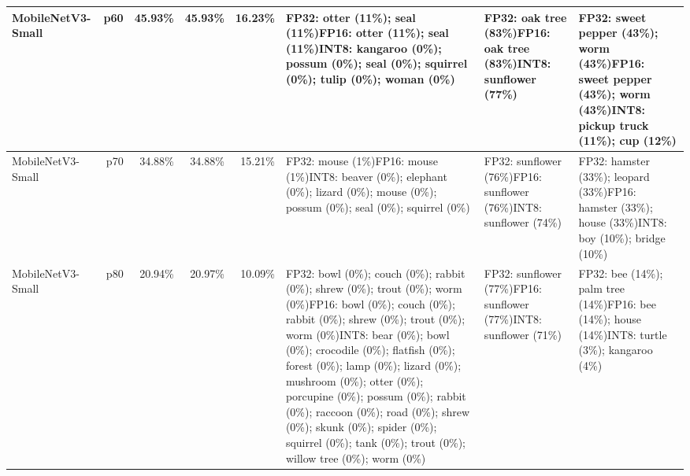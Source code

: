 \begin{longtable}{p{2.8cm} r r r r p{5.0cm} p{4.2cm} p{4.2cm}}
MobileNetV3-Small & p60 & 45.93\% & 45.93\% & 16.23\% & FP32: otter (11\%); seal (11\%)\newline FP16: otter (11\%); seal (11\%)\newline INT8: kangaroo (0\%); possum (0\%); seal (0\%); squirrel (0\%); tulip (0\%); woman (0\%) & FP32: oak tree (83\%)\newline FP16: oak tree (83\%)\newline INT8: sunflower (77\%) & FP32: sweet pepper (43\%); worm (43\%)\newline FP16: sweet pepper (43\%); worm (43\%)\newline INT8: pickup truck (11\%); cup (12\%) \\ \hline
MobileNetV3-Small & p70 & 34.88\% & 34.88\% & 15.21\% & FP32: mouse (1\%)\newline FP16: mouse (1\%)\newline INT8: beaver (0\%); elephant (0\%); lizard (0\%); mouse (0\%); possum (0\%); seal (0\%); squirrel (0\%) & FP32: sunflower (76\%)\newline FP16: sunflower (76\%)\newline INT8: sunflower (74\%) & FP32: hamster (33\%); leopard (33\%)\newline FP16: hamster (33\%); house (33\%)\newline INT8: boy (10\%); bridge (10\%) \\ \hline
MobileNetV3-Small & p80 & 20.94\% & 20.97\% & 10.09\% & FP32: bowl (0\%); couch (0\%); rabbit (0\%); shrew (0\%); trout (0\%); worm (0\%)\newline FP16: bowl (0\%); couch (0\%); rabbit (0\%); shrew (0\%); trout (0\%); worm (0\%)\newline INT8: bear (0\%); bowl (0\%); crocodile (0\%); flatfish (0\%); forest (0\%); lamp (0\%); lizard (0\%); mushroom (0\%); otter (0\%); porcupine (0\%); possum (0\%); rabbit (0\%); raccoon (0\%); road (0\%); shrew (0\%); skunk (0\%); spider (0\%); squirrel (0\%); tank (0\%); trout (0\%); willow tree (0\%); worm (0\%) & FP32: sunflower (77\%)\newline FP16: sunflower (77\%)\newline INT8: sunflower (71\%) & FP32: bee (14\%); palm tree (14\%)\newline FP16: bee (14\%); house (14\%)\newline INT8: turtle (3\%); kangaroo (4\%) \\ \hline

\end{longtable}
